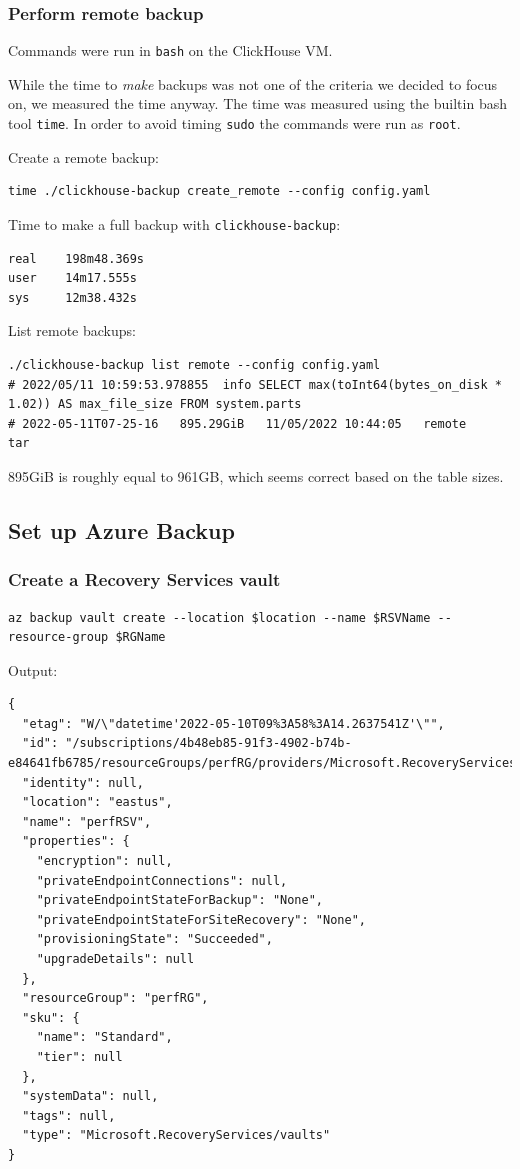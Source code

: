 \subsubsection{Perform remote backup}
\label{sec:org982a0d7}
Commands were run in \texttt{bash} on the ClickHouse VM.

While the time to \emph{make} backups was not one of the criteria
we decided to focus on, we measured the time anyway.
The time was measured using the builtin bash tool \texttt{time}.
In order to avoid timing \texttt{sudo} the commands were run as \texttt{root}.

Create a remote backup:
\begin{verbatim}
time ./clickhouse-backup create_remote --config config.yaml
\end{verbatim}

Time to make a full backup with \texttt{clickhouse-backup}:
\begin{verbatim}
real    198m48.369s
user    14m17.555s
sys     12m38.432s
\end{verbatim}

List remote backups:
\begin{verbatim}
./clickhouse-backup list remote --config config.yaml
# 2022/05/11 10:59:53.978855  info SELECT max(toInt64(bytes_on_disk * 1.02)) AS max_file_size FROM system.parts
# 2022-05-11T07-25-16   895.29GiB   11/05/2022 10:44:05   remote      tar
\end{verbatim}

895GiB is roughly equal to 961GB, which seems correct based on the table sizes.

\subsection{Set up Azure Backup}
\label{sec:org29e551a}
\subsubsection{Create a Recovery Services vault}
\label{sec:orgc6db81c}
\begin{verbatim}
az backup vault create --location $location --name $RSVName --resource-group $RGName
\end{verbatim}

Output:
\begin{verbatim}
{
  "etag": "W/\"datetime'2022-05-10T09%3A58%3A14.2637541Z'\"",
  "id": "/subscriptions/4b48eb85-91f3-4902-b74b-e84641fb6785/resourceGroups/perfRG/providers/Microsoft.RecoveryServices/vaults/perfRSV",
  "identity": null,
  "location": "eastus",
  "name": "perfRSV",
  "properties": {
    "encryption": null,
    "privateEndpointConnections": null,
    "privateEndpointStateForBackup": "None",
    "privateEndpointStateForSiteRecovery": "None",
    "provisioningState": "Succeeded",
    "upgradeDetails": null
  },
  "resourceGroup": "perfRG",
  "sku": {
    "name": "Standard",
    "tier": null
  },
  "systemData": null,
  "tags": null,
  "type": "Microsoft.RecoveryServices/vaults"
}
\end{verbatim}

